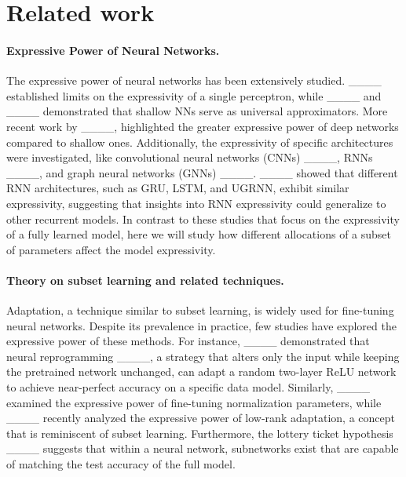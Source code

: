 \section{Related work}
\paragraph{Expressive Power of Neural Networks.} 

The expressive power of neural networks has been extensively studied. ____ established limits on the expressivity of a single perceptron, while ____ and ____ demonstrated that shallow NNs serve as universal approximators. More recent work by ____, highlighted the greater expressive power of deep networks compared to shallow ones. Additionally, the expressivity of specific architectures were investigated, like convolutional neural networks (CNNs) ____, RNNs ____, and graph neural networks (GNNs) ____. ____ showed that different RNN architectures, such as GRU, LSTM, and UGRNN, exhibit similar expressivity, suggesting that insights into RNN expressivity could generalize to other recurrent models. In contrast to these studies that focus on the expressivity of a fully learned model, here we will study how different allocations of a subset of parameters affect the model expressivity.

\paragraph{Theory on subset learning and related techniques.}

Adaptation, a technique similar to subset learning, is widely used for fine-tuning neural networks. Despite its prevalence in practice, few studies have explored the expressive power of these methods. For instance, ____ demonstrated that neural reprogramming ____, a strategy that alters only the input while keeping the pretrained network unchanged, can adapt a random two-layer ReLU network to achieve near-perfect accuracy on a specific data model. Similarly, ____ examined the expressive power of fine-tuning normalization parameters, while ____ recently analyzed the expressive power of low-rank adaptation, a concept that is reminiscent of subset learning. Furthermore, the lottery ticket hypothesis ____ suggests that within a neural network, subnetworks exist that are capable of matching the test accuracy of the full model.